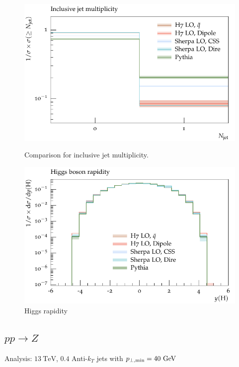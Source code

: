 \begin{figure}[h]
  \centering
  \begin{minipage}[t]{0.49\textwidth}
    \includegraphics[width=1\textwidth]{plots/H-125-MuShower/LH_H/jet_multi_inclusive.pdf}
    \caption{Comparison for inclusive jet multiplicity.}
    \label{fig:h:jet_multi_inc}
  \end{minipage}
  \begin{minipage}[t]{0.49\textwidth}
    \includegraphics[width=1\textwidth]{plots/H-125-MuShower/LH_H/X_y.pdf}
    \caption{Higgs rapidity}
    \label{fig:h:y}
  \end{minipage}
\end{figure}


\subsection{$pp\to Z$}
\label{sec:psunc:results:dy}
Analysis: $13~\mathrm{TeV}$, $0.4$ Anti-$k_T$ jets with $p_{\perp,\mathrm{min}}=40~\textrm{GeV}$


